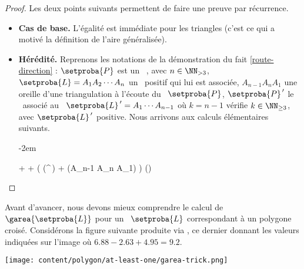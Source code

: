 \begin{proof}
    Les deux points suivants permettent de faire une preuve par récurrence.

    \begin{itemize}
		\item \textbf{Cas de base.}
		L'égalité est immédiate pour les triangles (c'est ce qui a motivé la définition de l'aire généralisée).


		\item \textbf{Hérédité.}
		Reprenons les notations de la démonstration du fait \ref{route-direction} : $\setproba{P}$ est un \ngone\ , avec $n \in \NN_{>3}$, $\setproba{L} = A_1 A_2 \cdots A_n$ un \ncycle\ positif qui lui est associée, $A_{n-1} A_n A_1$ une oreille d'une triangulation à l'écoute du \ngone\ $\setproba{P}$, $\setproba{P}^{\,\prime}$ le \kgone\ associé au \kcycle\ $\setproba{L}^{\,\prime} = A_1 \cdots A_{n-1}$ où $k = n-1$ vérifie $k \in \NN_{\geq3}$, avec $\setproba{L}^{\,\prime}$ positive. Nous arrivons aux calculs élémentaires suivants.
		
		\leavevmode\kern-2em%
		\begin{stepcalc}[style=ar*]
		          {}
		     + 
		          {}
		     + 
		          {}
		     \big( \mu(^{\,\prime}) + \mu(A_{n-1} A_n A_1) \big)
		          {}
		     \mu()
		          {}
		\end{stepcalc}
    \end{itemize}
\end{proof}






Avant d'avancer, nous devons mieux comprendre le calcul de $\garea{\setproba{L}}$ pour un \ncycle\ $\setproba{L}$ correspondant à un polygone croisé.
Considérons la figure suivante produite via \geogebra, ce dernier donnant les valeurs indiquées sur l'image où $\num{6.88} - \num{2.63} + \num{4.95} = \num{9.2}$.


\begin{center}
    \texttt{[image: content/polygon/at-least-one/garea-trick.png]}
\end{center}


